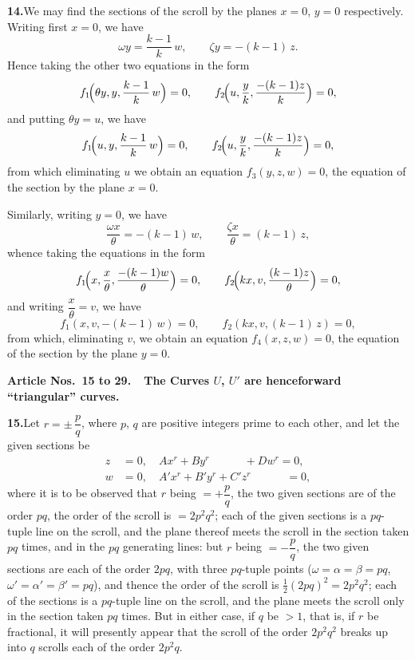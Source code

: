 \documentclass[11pt,a4paper]{article}
\begin{document}
\textbf{14.}\quad We may find the sections of the scroll by the planes $x = 0$,
$y = 0$ respectively. Writing first $x = 0$, we have
\[
\omega y = \frac{k - 1}{k}\,w, \qquad \zeta y = -(k - 1)\,z.
\]
Hence taking the other two equations in the form
\[
f_{1}\!\Bigl(\theta y, y, \frac{k - 1}{k}\,w\Bigr) = 0, \qquad
f_{2}\!\Bigl(u, \frac{y}{k}, \frac{-(k - 1)z}{k}\Bigr) = 0,
\]
and putting $\theta y = u$, we have
\[
f_{1}\!\Bigl(u, y, \frac{k - 1}{k}\,w\Bigr) = 0, \qquad
f_{2}\!\Bigl(u, \frac{y}{k}, \frac{-(k - 1)z}{k}\Bigr) = 0,
\]
from which eliminating $u$ we obtain an equation $f_{3}(y, z, w) = 0$, the
equation of the section by the plane $x = 0$.

Similarly, writing $y = 0$, we have
\[
\frac{\omega x}{\theta} = -(k - 1)\,w, \qquad
\frac{\zeta x}{\theta} = (k - 1)\,z,
\]
whence taking the equations in the form
\[
f_{1}\!\Bigl(x, \frac{x}{\theta}, \frac{-(k - 1)w}{\theta}\Bigr) = 0, \qquad
f_{2}\!\Bigl(kx, v, \frac{(k - 1)z}{\theta}\Bigr) = 0,
\]
and writing $\dfrac{x}{\theta} = v$, we have
\[
f_{1}(x, v, -(k - 1)\,w) = 0, \qquad f_{2}(kx, v, (k - 1)\,z) = 0,
\]
from which, eliminating $v$, we obtain an equation $f_{4}(x, z, w) = 0$, the
equation of the section by the plane $y = 0$.

\medskip
\noindent\textbf{Article Nos.~15 to 29.\ \ The Curves $U$, $U'$ are henceforward
``triangular'' curves.}
\medskip

\textbf{15.}\quad Let $r = \pm\,\dfrac{p}{q}$, where $p$, $q$ are positive
integers prime to each other, and let the given sections be
\begin{align*}
z &= 0, \quad Ax^{r} + By^{r} \phantom{{} + C'z^{r}} + Dw^{r} = 0, \\
w &= 0, \quad A'x^{r} + B'y^{r} + C'z^{r} \phantom{{} + Dw^{r}} = 0,
\end{align*}
where it is to be observed that $r$ being $= +\dfrac{p}{q}$, the two given
sections are of the order $pq$, the order of the scroll is $= 2p^{2}q^{2}$;
each of the given sections is a $pq$-tuple line on the scroll, and the plane
thereof meets the scroll in the section taken $pq$ times, and in the $pq$
generating lines: but $r$ being $= -\dfrac{p}{q}$, the two given sections are
each of the order $2pq$, with three $pq$-tuple points
($\omega = \alpha = \beta = pq$, $\omega' = \alpha' = \beta' = pq$), and thence
the order of the scroll is $\tfrac{1}{2}(2pq)^{2} = 2p^{2}q^{2}$; each of the
sections is a $pq$-tuple line on the scroll, and the plane meets the scroll
only in the section taken $pq$ times. But in either case, if $q$ be $> 1$, that
is, if $r$ be fractional, it will presently appear that the scroll of the order
$2p^{2}q^{2}$ breaks up into $q$ scrolls each of the order $2p^{2}q$.
\end{document}
